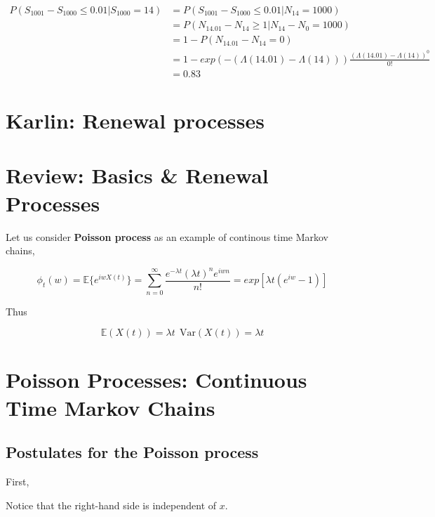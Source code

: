 \documentclass[12pt]{article}
\theoremstyle{nonumberbreak}
\begin{document}
$$
\begin{aligned}
P(S_{1001} - S_{1000} \le 0.01 | S_{1000} = 14) &= P(S_{1001} - S_{1000} \le 0.01 | N_{14} = 1000) \\[8pt]
&= P( N_{14.01} - N_{14} \ge 1 | N_{14} - N_0 = 1000) \\[8pt]
&= 1- P( N_{14.01} - N_{14} = 0 ) \\[8pt]
&= 1- exp(-(\Lambda(14.01) - \Lambda(14)) ) \frac{(\Lambda(14.01) - \Lambda(14))^0}{0!} \\[8pt]
&= 0.83
\end{aligned}
$$





\pagebreak
\section*{Karlin: Renewal processes}
\setcounter{section}{0}


\section{Review: Basics \& Renewal Processes}



Let us consider \textbf{Poisson process} as an example of continous time Markov chains,

$$
\phi_t (w) = \mathbb{E} \{ e^{iwX(t)} \} = \sum_{n=0}^\infty \frac{e^{-\lambda t} (\lambda t)^n e^{iwn}}{n!} = exp[\lambda t (e^{iw} -1)]
$$

Thus 

$$
\mathbb{E} (X(t)) = \lambda t \ \ \mathrm{Var}(X(t)) = \lambda t
$$


\section{Poisson Processes: Continuous Time Markov Chains}


\subsection{Postulates for the Poisson process}


First, 

Notice that the right-hand side is independent of $x$. 
\end{document}
